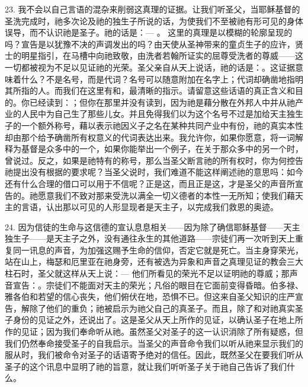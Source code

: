 23. 我不会以自己言语的混杂来削弱这真理的证据。让我们听圣父，当耶稣基督的圣洗完成时，祂多次论及祂的独生子所说的话，为使我们不至被祂有形可见的身体误导，而不认识祂是圣子。祂的话是：— 。 这里的真理是以模糊的轮廓呈现的吗？宣告是以犹豫不决的声调发出的吗？由天使从圣神带来的童贞生子的应许，贤士的明星指引，在马槽中向祂致敬，由洗者若翰所证实的屈尊受洗者的尊威——这一切都被视为不足以见证祂的光荣。圣父亲自从天上说话，祂的话是：。这证据意味着什么？不是名号，而是代词？名号可以随意附加在名字上；代词却确凿地指明其所指的人。而我们在这里有和，最清晰的指示。请留意这些话语的真正含义和目的。你已经读到：；但你在那里并没有读到，因为祂是藉分散在外邦人中并从祂产业的人民中为自己生了那些儿女。并且免得我们以为这个名号不过是加给天主独生子的一个额外称号，藉以表示祂因义子之名在某种共同产业中有份，祂的真实本性却由那个给予确凿所有权意义的代词表达出来。我允许你，如果你愿意，将一词解释为基督是众多中的一个，如果你能举出一个例子，在关于那众多中的另一个时，曾说过。反之，如果是祂特有的称号，那么当圣父断言祂的所有权时，你为何控告祂提出没有根据的要求呢？当圣父说时，我们难道不能这样阐述祂的意思吗：如今还有什么合理的借口可以用于不信呢？正是这，而且正是这，才是圣父的声音所宣告的。祂愿意我们不致对那来受洗以满全一切义德者的本性一无所知；使我们藉天主的言语，认出那以可见的人形显现者是天主子，以完成我们救恩的奥迹。\par

24. 因为信徒的生命与这信德的宣认息息相关——因为除了确信耶稣基督——天主独生子——是天主子之外，没有通往永生的其他道路——宗徒们再一次听到天上重复同一讯息的声音，为加强这赐予生命的信仰，否定它就是死亡。当主身穿荣光，站在山上，梅瑟和厄里亚在祂身旁，还有被选为异象和声音之真理见证的教会三大柱石时，圣父就这样从天上说：—  他们所看见的荣光不足以证明祂的尊威；那声音宣告：。宗徒们不能面对天主的荣光；凡俗的眼目在它面前变得昏暗。伯多禄、雅各伯和若望的信心丧失，他们俯伏在地，恐惧不已。但这来自圣父知识的庄严宣告，解除了他们的重负；祂被启示为祂父自己的真圣子。而且，除了和对祂真实圣子身份的见证之外，还说出了。这是圣父从天上所作的见证，以确认圣子在地上所作的见证；因为我们奉命听从祂。虽然圣父对圣子的这一认识消除了所有疑惑，但我们仍然奉命接受圣子的自我启示。当圣父的声音命令我们以听从祂来显示我们的服从时，我们被命令对圣子的话语寄予绝对的信任。因此，既然圣父在要我们听从圣子的这个讯息中显明了祂的旨意，就让我们听听圣子关于祂自己告诉了我们什么。\par

